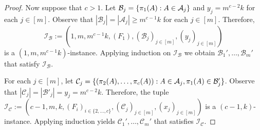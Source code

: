 \documentclass{patmorin}
\DeclarePairedDelimiter\set{\{}{\}}
\renewcommand{\mid}{:}  %
\begin{document}
\begin{proof}
Now suppose that $c>1$.
Let $\mathcal{B}_j=\set{\pi_1(A)\mid A\in\mathcal{A}_j}$ and
$y_j=m^{c-2}k$ for each $j\in[m]$. Observe that
$|\mathcal{B}_j|=|\mathcal{A}_j|\geq m^{c-1}k$ for each $j\in[m]$.
Therefore,
\[
  \mathcal{I}_{\mathcal{B}}:=(1,m,m^{c-1}k,(F_1),(\mathcal{B}_j)_{j\in[m]},(y_j)_{j\in[m]})
\]
is a $(1,m,m^{c-1}k)$-instance.  Applying induction on $\mathcal{I}_\mathcal{B}$ we obtain
$\mathcal{B}_1',\ldots,\mathcal{B}_m'$ that satisfy $\mathcal{I}_{\mathcal{B}}$.





For each $j\in[m]$, let $\mathcal{C}_j=\set{(\pi_2(A),\ldots,\pi_c(A))\mid A\in\mathcal{A}_j, \pi_1(A)\in \mathcal{B}'_j}$. Observe that
$|\mathcal{C}_j|=|\mathcal{B}'_j|=y_j=m^{c-2}k$.  Therefore, the tuple
$\mathcal{I}_{\mathcal{C}}:=(c-1,m,k,(F_i)_{i\in\{2,\ldots,c\}},(\mathcal{C}_j)_{j\in[m]},(x_j)_{j\in[m]})$
is a $(c-1,k)$-instance.  Applying induction yields $\mathcal{C}_1',\ldots,\mathcal{C}_m'$ that satisfies $\mathcal{I}_{\mathcal{C}}$.





\end{proof}
\end{document}
